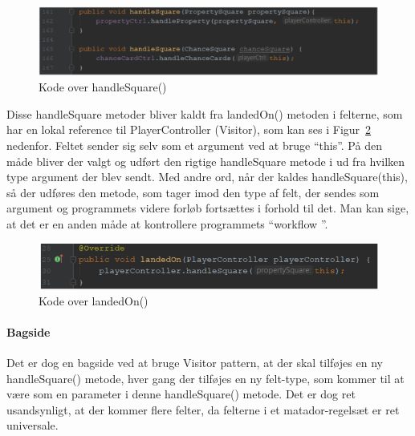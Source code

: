 \documentclass[class=article, crop=false]{standalone}
\begin{document}
        \begin{figure}[H]
        \centering
        \includegraphics[scale=0.5]{pics/handle_square.png}
        \caption{Kode over handleSquare()}\label{fig:handle_square}
    \end{figure}
        Disse handleSquare metoder bliver kaldt fra landedOn() metoden i felterne, som har en lokal reference til PlayerController (Visitor), som kan ses i Figur~\ref{fig:landed_on} nedenfor. Feltet sender sig selv som et argument ved at bruge “this”. På den måde bliver der valgt og udført den rigtige handleSquare metode i ud fra hvilken type argument der blev sendt. Med andre ord, når der kaldes handleSquare(this), så der udføres den metode, som tager imod den type af felt, der sendes som argument og programmets videre forløb fortsættes i forhold til det. Man kan sige, at det er en anden måde at kontrollere programmets “workflow ”.
        \begin{figure}[H]
            \centering
            \includegraphics[scale=0.6]{pics/landed_on.PNG}
            \caption{Kode over landedOn()}\label{fig:landed_on}
        \end{figure}


       \paragraph{Bagside \newline}
        Det er dog en bagside ved at bruge Visitor pattern, at der skal tilføjes en ny handleSquare() metode, hver gang der tilføjes en ny felt-type, som kommer til at være som en parameter i denne handleSquare() metode. Det er dog ret usandsynligt, at der kommer flere felter, da felterne i et matador-regelsæt er ret universale.
\end{document}
